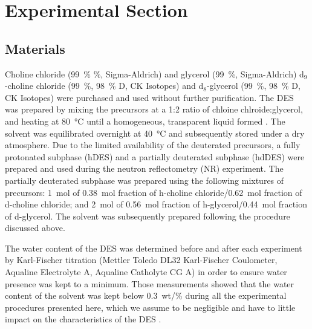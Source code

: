 \documentclass[amsmath,amssymb,twocolumn,superscriptaddress]{revtex4-1}
\begin{document}
\section{Experimental Section}
%
\subsection{Materials}
%
Choline chloride (\SI{99}{\percent} \%, Sigma-Aldrich) and glycerol (\SI{99}{\percent}, Sigma-Aldrich) d$_9$-choline chloride (\SI{99}{\percent}, \SI{98}{\percent} D, CK Isotopes) and d$_8$-glycerol (\SI{99}{\percent}, \SI{98}{\percent} D, CK Isotopes) were purchased and used without further purification.
The DES was prepared by mixing the precursors at a 1:2 ratio of chloine chlroide:glycerol, and heating at \SI{80}{\celsius} until a homogeneous, transparent liquid formed \cite{Smith2014}.
The solvent was equilibrated overnight at \SI{40}{\celsius} and subsequently stored under a dry atmosphere.
Due to the limited availability of the deuterated precursors, a fully protonated subphase (hDES) and a partially deuterated subphase (hdDES) were prepared and used during the neutron reflectometry (NR) experiment.
The partially deuterated subphase was prepared using the following mixtures of precursors: \SI{1}{\mole} of \SI{0.38}{\mole} fraction of h-choline chloride/\SI{0.62}{\mole} fraction of d-choline chloride; and \SI{2}{\mole} of \SI{0.56}{\mole} fraction of h-glycerol/\SI{0.44}{\mole} fraction of d-glycerol.
The solvent was subsequently prepared following the procedure discussed above.

The water content of the DES was determined before and after each experiment by Karl-Fischer titration (Mettler Toledo DL32 Karl-Fischer Coulometer, Aqualine Electrolyte A, Aqualine Catholyte CG A) in order to ensure water presence was kept to a minimum.
Those measurements showed that the water content of the solvent was kept below \SI{0.3}{wt/\percent} during all the experimental procedures presented here, which we assume to be negligible and have to little impact on the characteristics of the DES \cite{Hammond2016,Hammond2017}.
\end{document}
